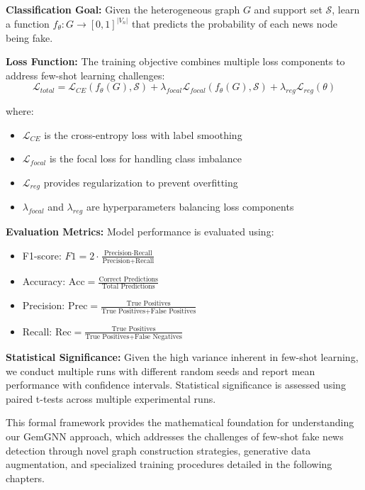 \textbf{Classification Goal:} Given the heterogeneous graph $G$ and support set $\mathcal{S}$, learn a function $f_{\theta}: G \rightarrow [0,1]^{|V_n|}$ that predicts the probability of each news node being fake.

\textbf{Loss Function:} The training objective combines multiple loss components to address few-shot learning challenges:
\begin{equation}
\mathcal{L}_{total} = \mathcal{L}_{CE}(f_{\theta}(G), \mathcal{S}) + \lambda_{focal} \mathcal{L}_{focal}(f_{\theta}(G), \mathcal{S}) + \lambda_{reg} \mathcal{L}_{reg}(\theta)
\end{equation}

where:
\begin{itemize}
\item $\mathcal{L}_{CE}$ is the cross-entropy loss with label smoothing
\item $\mathcal{L}_{focal}$ is the focal loss for handling class imbalance
\item $\mathcal{L}_{reg}$ provides regularization to prevent overfitting
\item $\lambda_{focal}$ and $\lambda_{reg}$ are hyperparameters balancing loss components
\end{itemize}

\textbf{Evaluation Metrics:} Model performance is evaluated using:
\begin{itemize}
\item F1-score: $F1 = 2 \cdot \frac{\text{Precision} \cdot \text{Recall}}{\text{Precision} + \text{Recall}}$
\item Accuracy: $\text{Acc} = \frac{\text{Correct Predictions}}{\text{Total Predictions}}$
\item Precision: $\text{Prec} = \frac{\text{True Positives}}{\text{True Positives} + \text{False Positives}}$
\item Recall: $\text{Rec} = \frac{\text{True Positives}}{\text{True Positives} + \text{False Negatives}}$
\end{itemize}

\textbf{Statistical Significance:} Given the high variance inherent in few-shot learning, we conduct multiple runs with different random seeds and report mean performance with confidence intervals. Statistical significance is assessed using paired t-tests across multiple experimental runs.

This formal framework provides the mathematical foundation for understanding our GemGNN approach, which addresses the challenges of few-shot fake news detection through novel graph construction strategies, generative data augmentation, and specialized training procedures detailed in the following chapters.

\EndChapter
